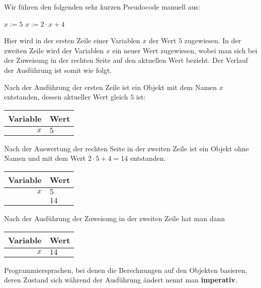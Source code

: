 \begin{bsp} Wir führen den folgenden sehr kurzen Pseudocode manuell aus: 
\begin{center}
	\begin{algorithmic}[1]
		\STATE $x:=5$ 
		\STATE $x:=2 \cdot x + 4$
	\end{algorithmic}
\end{center}

Hier wird in der ersten Zeile einer Variablen $x$ der Wert $5$ zugewiesen. 
In der zweiten Zeile wird der Variablen $x$ ein neuer Wert zugewiesen, wobei man sich bei der Zuweisung in der rechten Seite auf den aktuellen Wert bezieht. Der Verlauf der Ausführung ist somit wie folgt. 

Nach der Ausführung der ersten Zeile ist ein Objekt mit dem Namen $x$ entstanden, dessen aktueller Wert gleich $5$ ist: 

\begin{center} 
\begin{tabular}{r|l}
	Variable & Wert
	\\ \hline 
	$x$ & $5$ 
\end{tabular} 
\end{center} 

Nach der Auswertung der rechten Seite in der zweiten Zeile ist ein Objekt ohne Namen und mit dem Wert $2 \cdot 5 + 4 = 14$ entstanden. 

\begin{center} 
\begin{tabular}{r|l}
	Variable & Wert
	\\ \hline 
	$x$ & $5$  \\
	 & $14$ 
\end{tabular} 
\end{center} 

Nach der Ausführung der Zuweisung in der zweiten Zeile hat man dann

\begin{center} 
	\begin{tabular}{r|l}
		Variable & Wert
		\\ \hline 
		$x$ & $14$  
	\end{tabular} 
\end{center} 
\end{bsp} 


\begin{defn}
	Programmiersprachen, bei denen die Berechnungen auf den Objekten basieren, deren Zustand sich während der Ausführung ändert nennt man \textbf{imperativ}. 
\end{defn} 


